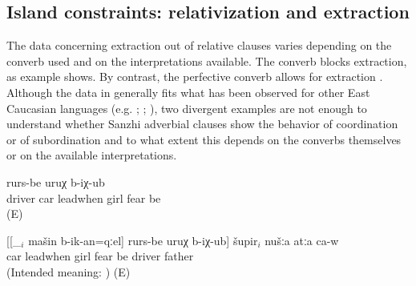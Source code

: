 
\subsection{Island constraints: relativization and extraction}
\label{ssec:Island constraints: relativization and extraction}

The data concerning extraction out of relative clauses varies depending on the converb used and on the interpretations available. The converb  blocks extraction, as example  shows. By contrast, the perfective converb allows for extraction . Although the data in  generally fits what has been observed for other East Caucasian languages (e.g. \citealp{Kazenin.Testelets2004}; \citealp{Creissels2012}; \citealp{Bickel2010}), two divergent examples are not enough to understand whether Sanzhi adverbial clauses show the behavior of coordination or of subordination and to what extent this depends on the converbs themselves or on the available interpretations.
%
\begin{exe}
	\ex	\label{ex:father was guiding the car}
	\begin{xlist}

	\ex	\label{ex:When father was guiding the car, the girls became afraid}
	\gll	[šupir-ri mašin	b-ik-an=qːel]	rurs-be	uruχ	b-iχ-ub	\\
		driver	car	leadwhen	girl	fear	be\\
	\glt	{} (E)

	\ex	\label{ex:The driver who when driving the car the girls got afraid is our father}
	\gll	{*}	[[\_$_{i}$ mašin	b-ik-an=qːel]	rurs-be	uruχ	b-iχ-ub]	šupir$_{i}$	nušːa	atːa	ca-w\\
		{}	 car	leadwhen	girl	fear	be	driver		father	\\
	\glt	(Intended meaning: ) (E)
	\end{xlist}
\end{exe}

